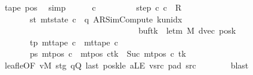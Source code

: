 \begin{isabellebody}
\ tape{}\ pos{}\ \isamarkupfalse%
\ simp\isanewline
\ \ \ \ \isamarkupfalse%
\ c{\isacharprime}{\kern0pt}{\isacharprime}{\kern0pt}\ \isanewline
\ \ \ \ \ \ \ \ step{\isacharcolon}{\kern0pt}\ {\isachardoublequoteopen}{\isacharparenleft}{\kern0pt}c{\isacharprime}{\kern0pt}{\isacharcomma}{\kern0pt}\ c{\isacharprime}{\kern0pt}{\isacharprime}{\kern0pt}{\isacharparenright}{\kern0pt}\ {\isasymin}\ R{\isacharprime}{\kern0pt}{\isachardoublequoteclose}\isanewline
\ \ \ \ \ \ \ st{\isacharcolon}{\kern0pt}\ {\isachardoublequoteopen}mt{\isacharunderscore}{\kern0pt}state\ c{\isacharprime}{\kern0pt}{\isacharprime}{\kern0pt}\ {\isacharequal}{\kern0pt}\ {\isacharparenleft}{\kern0pt}q{\isacharcomma}{\kern0pt}\ AR{\isacharunderscore}{\kern0pt}SimCompute{\isacharcomma}{\kern0pt}\ k{\isacharunderscore}{\kern0pt}unidx\ {}{\isacharcomma}{\kern0pt}\ {}{\isacharcomma}{\kern0pt}\isanewline
\ \ \ \ \ \ \ \ \ \ \ \ \ \ \ \ \ \ \ \ \ \ \ \ \ \ \ \ \ \ \ \ \ buf{\isacharparenleft}{\kern0pt}tk\ {\isacharcolon}{\kern0pt}{\isacharequal}{\kern0pt}\ le{\isacharunderscore}{\kern0pt}tm\ M{\isacharparenright}{\kern0pt}{\isacharcomma}{\kern0pt}\ dvec{\isacharcomma}{\kern0pt}\ posk{\isacharparenright}{\kern0pt}{\isachardoublequoteclose}\isanewline
\ \ \ \ \ \ \ tp{\isacharcolon}{\kern0pt}\ {\isachardoublequoteopen}mt{\isacharunderscore}{\kern0pt}tape\ c{\isacharprime}{\kern0pt}{\isacharprime}{\kern0pt}\ {\isacharequal}{\kern0pt}\ mt{\isacharunderscore}{\kern0pt}tape\ c{\isacharprime}{\kern0pt}{\isachardoublequoteclose}\isanewline
\ \ \ \ \ \ \ ps{\isacharcolon}{\kern0pt}\ {\isachardoublequoteopen}mt{\isacharunderscore}{\kern0pt}pos\ c{\isacharprime}{\kern0pt}{\isacharprime}{\kern0pt}\ {\isacharequal}{\kern0pt}\ {\isacharparenleft}{\kern0pt}mt{\isacharunderscore}{\kern0pt}pos\ c{\isacharprime}{\kern0pt}{\isacharparenright}{\kern0pt}{\isacharparenleft}{\kern0pt}tk\ {\isacharcolon}{\kern0pt}{\isacharequal}{\kern0pt}\ Suc\ {\isacharparenleft}{\kern0pt}mt{\isacharunderscore}{\kern0pt}pos\ c{\isacharprime}{\kern0pt}\ tk{\isacharparenright}{\kern0pt}{\isacharparenright}{\kern0pt}{\isachardoublequoteclose}\isanewline
\ \ \ \ \ \ \isamarkupfalse%
\ leaf{\isacharunderscore}{\kern0pt}le{\isacharbrackleft}{\kern0pt}OF\ vM\ stg\ qQ\ last\ posk{\isacharunderscore}{\kern0pt}le\ aLE\ vsrc\ pad{}\ src{}{\isacharbrackright}{\kern0pt}\isanewline
\ \ \ \ \ \ \isamarkupfalse%
\ blast\isanewline

\end{isabellebody}
